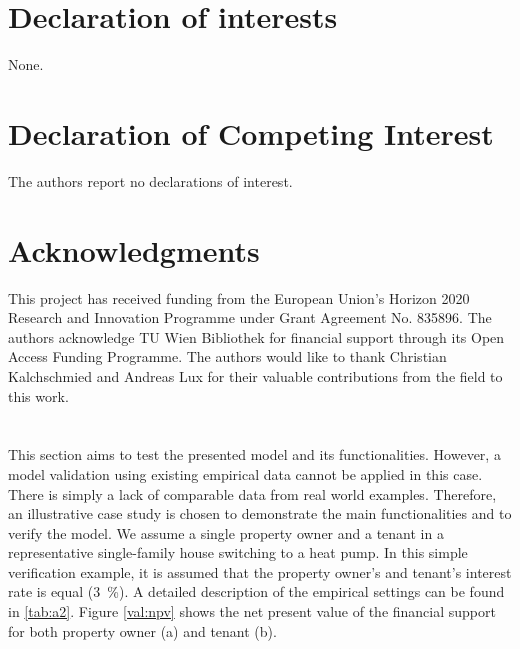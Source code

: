 \documentclass[review]{elsarticle}
\begin{document}






\section*{Declaration of interests}
None.
\section*{Declaration of Competing Interest}
The authors report no declarations of interest.
\section*{Acknowledgments}
This project has received funding from the European Union's Horizon 2020 Research and Innovation Programme under Grant Agreement No. 835896. The authors acknowledge TU Wien Bibliothek for financial support through its Open Access Funding Programme. The authors would like to thank Christian Kalchschmied and Andreas Lux for their valuable contributions from the field to this work.


\appendix
\setcounter{table}{0}
\setcounter{figure}{0}
\newpage
\section{}\label{appendix:ill}
This section aims to test  the presented model and its functionalities. However, a model validation using existing empirical data cannot be applied in this case. There is simply a lack of comparable data from real world examples. Therefore, an illustrative case study is chosen to demonstrate the main functionalities and to verify the model. We assume a single property owner and a tenant in a representative single-family house switching to a heat pump. In this simple verification example, it is assumed that the property owner's and tenant's interest rate is equal (\SI{3}{\%}). A detailed description of the empirical settings can be found in \ref{tab:a2}. Figure \ref{val:npv} shows the net present value of the financial support for both property owner (a) and tenant (b).
\end{document}
